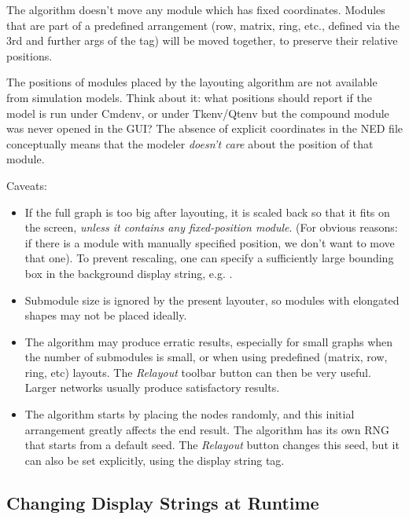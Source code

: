 The algorithm doesn't move any module which has fixed coordinates. Modules
that are part of a predefined arrangement (row, matrix, ring, etc., defined
via the 3rd and further args of the  tag) will be moved together,
to preserve their relative positions.

\begin{note}
The positions of modules placed by the layouting algorithm are not
available from simulation models. Think about it: what positions should
{\opp} report if the model is run under Cmdenv, or under Tkenv/Qtenv but
the compound module was never opened in the GUI? The absence of explicit
coordinates in the NED file conceptually means that the modeler
\textit{doesn't care} about the position of that module.
\end{note}

Caveats:

\begin{itemize}
  \item If the full graph is too big after layouting, it is scaled
    back so that it fits on the screen, \textit{unless it contains
    any fixed-position module}. (For obvious reasons: if there is a module
    with manually specified position, we don't want to move that one).
    To prevent rescaling, one can specify a sufficiently large bounding
    box in the background display string, e.g. .
  \item Submodule size is ignored by the present layouter, so modules
    with elongated shapes may not be placed ideally.
  \item The algorithm may produce erratic results, especially for small graphs
    when the number of submodules is small, or when using predefined
    (matrix, row, ring, etc) layouts. The \textit{Relayout} toolbar button
    can then be very useful. Larger networks usually produce
    satisfactory results.
  \item The algorithm starts by placing the nodes randomly, and this initial
    arrangement greatly affects the end result. The algorithm has its
    own RNG that starts from a default seed. The \textit{Relayout} button
    changes this seed, but it can also be set explicitly, using the
     display string tag.
\end{itemize}


\subsection{Changing Display Strings at Runtime}
\label{sec:graphics:changing-displaystrings-at-runtime}

